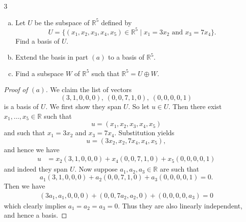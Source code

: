 \documentclass{extarticle}
\newenvironment{problem}[1]{\begin{prob*}{#1}{}}{\end{prob*}}
\newcommand{\R}{\mathbb{R}}
\begin{document}
\begin{problem}{3}
\begin{enumerate}[(a)]
\item Let $U$ be the subspace of $\R^5$ defined by
\begin{equation*}
U = \{(x_1,x_2,x_3,x_4,x_5)\in \R^5\mid x_1=3x_2\text{ and }x_3= 7x_4\}.
\end{equation*}
Find a basis of $U$.
\item Extend the basis in part $(a)$ to a basis of $\R^5$.
\item Find a subspace $W$ of $\R^5$ such that $\R^5=U\oplus W$.
\end{enumerate}
\end{problem}
\begin{proof}[Proof of $(a)$]
We claim the list of vectors
\begin{equation*}
(3, 1, 0, 0, 0), ~ (0, 0, 7, 1, 0), ~ (0, 0, 0, 0, 1)
\end{equation*}
is a basis of $U$.  We first show they span $U$.  So let $u\in U$.  Then there exist $x_1,\dots,x_5\in\R$ such that
\begin{equation*}
u = (x_1, x_2, x_3, x_4, x_5)
\end{equation*}
and such that $x_1=3x_2$ and $x_3 = 7x_4$.  Substitution yields
\begin{equation*}
u = (3x_2, x_2, 7x_4, x_4, x_5),
\end{equation*}
and hence we have
\begin{align*}
u &= x_2(3, 1, 0, 0, 0) + x_4(0, 0, 7, 1, 0) + x_5 (0, 0, 0, 0, 1)
\end{align*}
and indeed they span $U$.  Now suppose $a_1, a_2, a_3\in\R$ are such that 
\begin{equation*}
a_1(3, 1, 0, 0, 0) + a_2(0, 0, 7, 1, 0) + a_3(0, 0, 0, 0, 1) = 0.
\end{equation*}
Then we have
\begin{align*}
(3a_1, a_1, 0, 0, 0) + (0, 0, 7a_2, a_2, 0) + (0, 0, 0, 0, a_3) = 0
\end{align*}
which clearly implies $a_1=a_2=a_3 =0$.  Thus they are also linearly independent, and hence a basis.
\end{proof}
\end{document}
